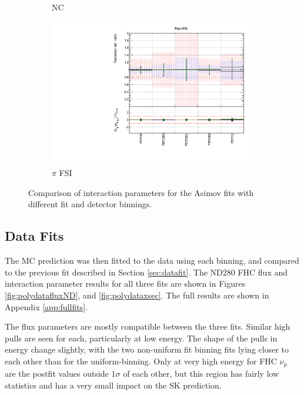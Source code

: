 \begin{figure}[!htbp]
\begin{subfigure}{0.49\textwidth}
  \caption{NC}
\end{subfigure}
\begin{subfigure}{0.49\textwidth}
  \centering
  \includegraphics[width=0.9\linewidth]{figs/polyasmvsxsec_5}
  \caption{$\pi$ FSI}
\end{subfigure}
\caption{Comparison of interaction parameters for the Asimov fits with different fit and detector binnings.}
\label{fig:polyasmvsxsec}
\end{figure}

\subsection{Data Fits}

The MC prediction was then fitted to the data using each binning, and compared to the previous fit described in Section \ref{sec:datafit}. The ND280 FHC flux and interaction parameter results for all three fits are shown in Figures \ref{fig:polydatafluxND}, and \ref{fig:polydataxsec}. The full results are shown in Appendix \ref{app:fullfits}.

The flux parameters are mostly compatible between the three fits. Similar high pulls are seen for each, particularly at low energy. The shape of the pulls in energy change slightly, with the two non-uniform fit binning fits lying closer to each other than for the uniform-binning. Only at very high energy for FHC $\nu_{\mu}$ are the postfit values outside $1\sigma$ of each other, but this region has fairly low statistics and has a very small impact on the SK prediction.

